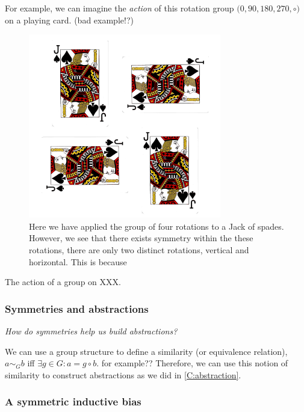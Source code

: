 For example, we can imagine the \textit{action} of this rotation group $\big(0, 90, 180, 270, \circ \big)$ on a playing card. (bad example!?)

\begin{figure}[h!]
	\centering
	\includegraphics[width=0.75\textwidth,height=0.5\textheight]{../../pictures/images/jacks.png}
	\caption{Here we have applied the group of four rotations to a Jack of spades.
	However, we see that there exists symmetry within the these rotations,
	there are only two distinct rotations, vertical and horizontal. This is because }
\end{figure}

The action of a group on XXX.

\subsubsection{Symmetries and abstractions}

\begin{displayquote}
\textsl{How do symmetries help us build abstractions?}
\end{displayquote}

We can use a group structure to define a similarity (or equivalence relation),
$a \sim_G b$ iff $\exists g \in G: a = g \circ b$. {\color{red} for example??} Therefore, we can use this
 notion of similarity to construct abstractions as we did in \ref{C:abstraction}.

 \subsubsection{A symmetric inductive bias}

